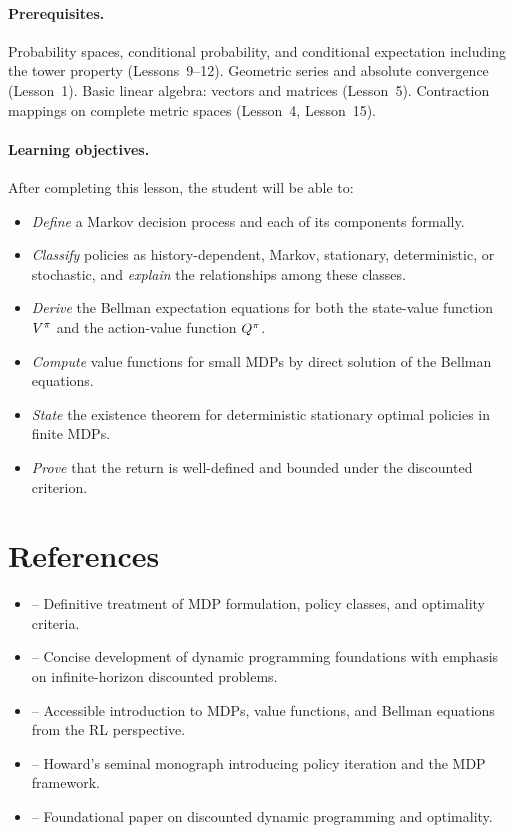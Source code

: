 \documentclass[11pt,a4paper]{article}
\begin{document}
\paragraph{Prerequisites.}
Probability spaces, conditional probability, and conditional
expectation including the tower property (Lessons~9--12). Geometric
series and absolute convergence (Lesson~1). Basic linear algebra:
vectors and matrices (Lesson~5). Contraction mappings on complete
metric spaces (Lesson~4, Lesson~15).

\paragraph{Learning objectives.}
After completing this lesson, the student will be able to:
\begin{itemize}
    \item \emph{Define} a Markov decision process and each of its
    components formally.
    \item \emph{Classify} policies as history-dependent, Markov,
    stationary, deterministic, or stochastic, and \emph{explain} the
    relationships among these classes.
    \item \emph{Derive} the Bellman expectation equations for both the
    state-value function $V^{\pi}$ and the action-value function $Q^{\pi}$.
    \item \emph{Compute} value functions for small MDPs by direct
    solution of the Bellman equations.
    \item \emph{State} the existence theorem for deterministic
    stationary optimal policies in finite MDPs.
    \item \emph{Prove} that the return is well-defined and bounded
    under the discounted criterion.
\end{itemize}


\section{References}
\label{sec:references}

\begin{itemize}
    \item \citet[Chapters 2--3]{puterman2014} -- Definitive treatment
    of MDP formulation, policy classes, and optimality criteria.
    \item \citet[Chapter 1]{bertsekas2012} -- Concise development of
    dynamic programming foundations with emphasis on infinite-horizon
    discounted problems.
    \item \citet[Chapters 3--4]{suttonbarto2018} -- Accessible
    introduction to MDPs, value functions, and Bellman equations from
    the RL perspective.
    \item \citet{howard1960} -- Howard's seminal monograph introducing
    policy iteration and the MDP framework.
    \item \citet{blackwell1962} -- Foundational paper on discounted
    dynamic programming and optimality.
\end{itemize}
\end{document}
